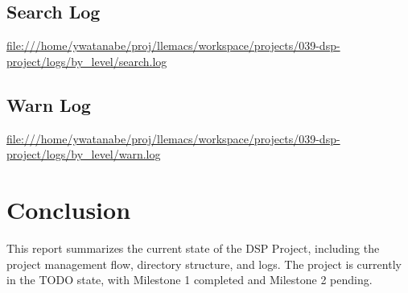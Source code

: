 \documentclass[11pt]{article}
\begin{document}
\subsection{Search Log}
\label{sec:orge4c1b29}
\url{file:///home/ywatanabe/proj/llemacs/workspace/projects/039-dsp-project/logs/by\_level/search.log}

\subsection{Warn Log}
\label{sec:org97d2ce9}
\url{file:///home/ywatanabe/proj/llemacs/workspace/projects/039-dsp-project/logs/by\_level/warn.log}

\section{Conclusion}
\label{sec:org5de0f95}
This report summarizes the current state of the DSP Project, including the project management flow, directory structure, and logs. The project is currently in the TODO state, with Milestone 1 completed and Milestone 2 pending.
\end{document}
